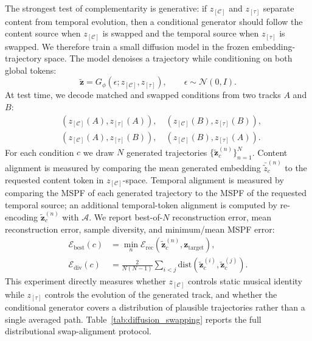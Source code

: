 \documentclass{article}
\newcommand{\zseq}{\mathbf{z}}          %
\newcommand{\zC}{z_{[\mathcal{C}]}}    %
\newcommand{\ztau}{z_{[\tau]}}          %
\newcommand{\agg}{\mathcal{A}}          %
\newcommand{\dist}{\mathrm{dist}}
\begin{document}
The strongest test of complementarity is generative: if $\zC$ and
$\ztau$ separate content from temporal evolution, then a conditional
generator should follow the content source when $\zC$ is swapped and
the temporal source when $\ztau$ is swapped.  We therefore train a
small diffusion model in the frozen embedding-trajectory space.  The
model denoises a trajectory while conditioning on both global tokens:
%
\begin{equation}
  \tilde{\zseq}
  =
  G_\phi(\epsilon;\zC,\ztau),
  \qquad
  \epsilon \sim \mathcal{N}(0,I).
  \label{eq:diffusion_conditioning}
\end{equation}
%
At test time, we decode matched and swapped conditions from two
tracks $A$ and $B$:
%
\begin{align}
  &(\zC(A),\ztau(A)),\quad (\zC(B),\ztau(B)),
  \nonumber\\
  &(\zC(A),\ztau(B)),\quad (\zC(B),\ztau(A)).
  \label{eq:diffusion_swaps}
\end{align}
%
For each condition $c$ we draw $N$ generated trajectories
$\{\tilde{\zseq}^{(n)}_c\}_{n=1}^{N}$.  Content alignment is
measured by comparing the mean generated embedding
$\bar{\tilde{z}}^{(n)}_c$ to the requested content token in
$\zC$-space.  Temporal alignment is measured by comparing the MSPF
of each generated trajectory to the MSPF of the requested temporal
source; an additional temporal-token alignment is computed by
re-encoding $\tilde{\zseq}^{(n)}_c$ with $\agg$.  We report
best-of-$N$ reconstruction error, mean reconstruction error,
sample diversity, and minimum/mean MSPF error:
%
\begin{align}
  \mathcal{E}_{\mathrm{best}}(c)
  &=
  \min_n \mathcal{E}_{\mathrm{rec}}
  (\tilde{\zseq}^{(n)}_c,\zseq_{\mathrm{target}}),
  \nonumber\\
  \mathcal{E}_{\mathrm{div}}(c)
  &=
  \frac{2}{N(N-1)}
  \sum_{i<j}
  \dist(\tilde{\zseq}^{(i)}_c,\tilde{\zseq}^{(j)}_c).
  \label{eq:diffusion_distribution_metrics}
\end{align}
%
This experiment directly measures whether $\zC$ controls static
musical identity while $\ztau$ controls the evolution of the
generated track, and whether the conditional generator covers a
distribution of plausible trajectories rather than a single averaged
path.  Table~\ref{tab:diffusion_swapping} reports the full
distributional swap-alignment protocol.
\end{document}
